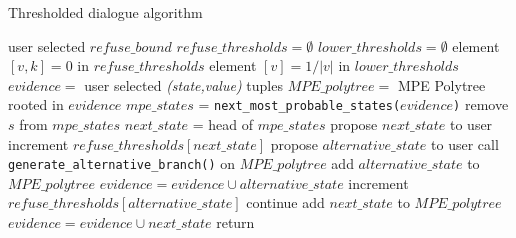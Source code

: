 \begin{algorithm}[htp!]
	\caption{Thresholded dialogue algorithm}
	\label{alg:pseudo-mpe-thresholded}
	\begin{algorithmic}[1]
		\State user selected $refuse\_bound$
		\State $refuse\_thresholds = \emptyset$
		\State $lower\_thresholds = \emptyset$
				\State element $[v,k]=0$ in $refuse\_thresholds$
			\EndFor
			\State element $[v]=1 / |v|$ in $lower\_thresholds$ 
		\EndFor
		\State $evidence = $ user selected \textit{(state,value)} tuples
		\State $MPE\_polytree = $ MPE Polytree rooted in $evidence$
		\State $mpe\_states$ = \texttt{next\_most\_probable\_states($evidence$)}
					\State remove $s$ from $mpe\_states$ 
				\EndIf
			\EndFor		
				\State $next\_state$ = head of $mpe\_states$ 
				\State propose $next\_state$ to user 
					\State increment $refuse\_thresholds[next\_state]$
						\State propose $alternative\_state$ to user 
							\State call \texttt{generate\_alternative\_branch()} on $MPE\_polytree$ 
							\State add $alternative\_state$ to $MPE\_polytree$
							\State $evidence = evidence \cup alternative\_state$
						\Else
							\State increment $refuse\_thresholds[alternative\_state]$
							\State continue
						\EndIf
					\EndFor
				\Else
					\State add $next\_state$ to $MPE\_polytree$
					\State $evidence = evidence \cup next\_state$
				\EndIf
			\Else 
				\State return
			\EndIf
		\EndWhile
	\end{algorithmic}
\end{algorithm} 


